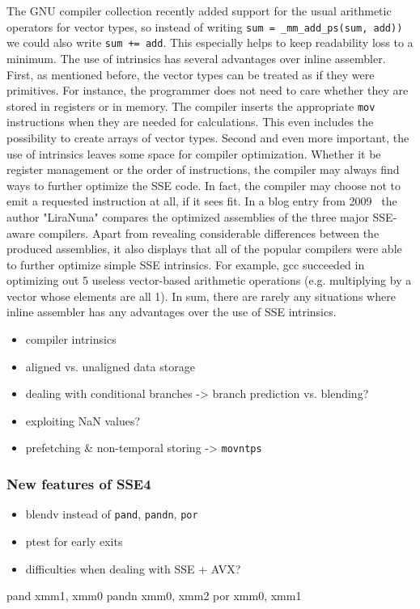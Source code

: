 The GNU compiler collection recently added support for the usual arithmetic operators for vector types, so instead of writing \texttt{sum = \_mm\_add\_ps(sum, add))} we could also write \texttt{sum += add}. This especially helps to keep readability loss to a minimum. The use of intrinsics has several advantages over inline assembler. First, as mentioned before, the vector types can be treated as if they were primitives. For instance, the programmer does not need to care whether they are stored in registers or in memory. The compiler inserts the appropriate \texttt{mov} instructions when they are needed for calculations. This even includes the possibility to create arrays of vector types. Second and even more important, the use of intrinsics leaves some space for compiler optimization. Whether it be register management or the order of instructions, the compiler may always find ways to further optimize the SSE code. In fact, the compiler may choose not to emit a requested instruction at all, if it sees fit. In a blog entry from 2009~\cite{liranuna2009} the author "LiraNuna" compares the optimized assemblies of the three major SSE-aware compilers. Apart from revealing considerable differences between the produced assemblies, it also displays that all of the popular compilers were able to further optimize simple SSE intrinsics. For example, gcc succeeded in optimizing out 5 useless vector-based arithmetic operations (e.g. multiplying by a vector whose elements are all 1). In sum, there are rarely any situations where inline assembler has any advantages over the use of SSE intrinsics.



\begin{itemize}
\item compiler intrinsics
\item aligned vs. unaligned data storage
\item dealing with conditional branches -> branch prediction vs. blending?
\item exploiting NaN values?
\item prefetching \& non-temporal storing -> \texttt{movntps}
\end{itemize}
\subsubsection{New features of SSE4}
\begin{itemize}
\item blendv instead of \texttt{pand}, \texttt{pandn}, \texttt{por}
\item ptest for early exits
\item difficulties when dealing with SSE + AVX?
\end{itemize}
\begin{assembler}
pand   xmm1, xmm0
pandn  xmm0, xmm2
por    xmm0, xmm1
\end{assembler}
